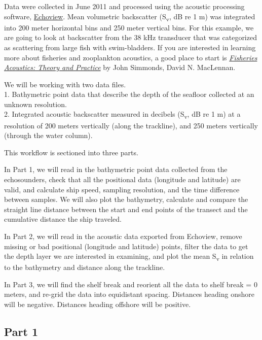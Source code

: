 \documentclass[]{article}
\begin{document}
Data were collected in June 2011 and processed using the acoustic
processing software, \href{https://www.echoview.com/}{Echoview}. Mean
volumetric backscatter (S\textsubscript{v}, dB re 1 m) was integrated
into 200 meter horizontal bins and 250 meter vertical bins. For this
example, we are going to look at backscatter from the 38 kHz transducer
that was categorized as scattering from large fish with swim-bladders.
If you are interested in learning more about fisheries and zooplankton
acoustics, a good place to start is
\href{https://www.wiley.com/en-us/Fisheries+Acoustics\%3A+Theory+and+Practice\%2C+2nd+Edition-p-9780470995297}{\emph{Fisheries
Acoustics: Theory and Practice}} by John Simmonds, David N. MacLennan.

We will be working with two data files.\\
1. Bathymetric point data that describe the depth of the seafloor
collected at an unknown resolution.\\
2. Integrated acoustic backscatter measured in decibels
(S\textsubscript{v}, dB re 1 m) at a resolution of 200 meters vertically
(along the trackline), and 250 meters vertically (through the water
column).

This workflow is sectioned into three parts.

In Part 1, we will read in the bathymetric point data collected from the
echosounders, check that all the positional data (longitude and
latitude) are valid, and calculate ship speed, sampling resolution, and
the time difference between samples. We will also plot the bathymetry,
calculate and compare the straight line distance between the start and
end points of the transect and the cumulative distance the ship
traveled.

In Part 2, we will read in the acoustic data exported from Echoview,
remove missing or bad positional (longitude and latitude) points, filter
the data to get the depth layer we are interested in examining, and plot
the mean S\textsubscript{v} in relation to the bathymetry and distance
along the trackline.

In Part 3, we will find the shelf break and reorient all the data to
shelf break = 0 meters, and re-grid the data into equidistant spacing.
Distances heading onshore will be negative. Distances heading offshore
will be positive.

\hypertarget{part-1}{%
\subsection{Part 1}\label{part-1}}
\end{document}
